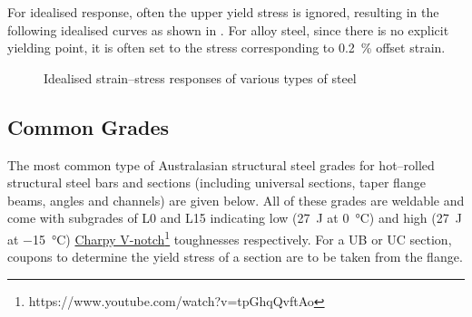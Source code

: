 For idealised response, often the upper yield stress is ignored, resulting in the following idealised curves as shown in .
For alloy steel, since there is no explicit yielding point, it is often set to the stress corresponding to \SI{0.2}{\percent} offset strain.
\begin{figure}[H]
\centering

\caption{Idealised strain--stress responses of various types of steel}\label{fig:steel_responses}
\end{figure}
\subsection{Common Grades}
The most common type of Australasian structural steel grades for hot--rolled structural steel bars and sections (including universal sections, taper flange beams, angles and channels) are given below.
All of these grades are weldable and come with subgrades of L0 and L15 indicating low (\SI{27}{\joule} at \SI{0}{\celsius}) and high (\SI{27}{\joule} at \SI{-15}{\celsius}) \href{https://www.youtube.com/watch?v=tpGhqQvftAo}{Charpy V-notch}\footnote{https://www.youtube.com/watch?v=tpGhqQvftAo} toughnesses respectively.
For a UB or UC section, coupons to determine the yield stress of a section are to be taken from the flange.
